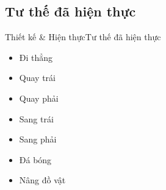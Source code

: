 \documentclass[compress, blue, 13pt,hyperref={pdfpagemode=FullScreen}]{beamer}
\begin{document}
\subsection{Tư thế đã hiện thực}
\begin{frame}{Thiết kế \& Hiện thực}{Tư thế đã hiện thực}
\begin{multicols}{2}
{
\begin{itemize}
\item Đi thẳng
\item Quay trái
\item Quay phải
\item Sang trái
\item Sang phải
\item Đá bóng
\item Nâng đồ vật
\end{itemize}
}
\columnbreak


\end{multicols}
\end{frame}
\end{document}
